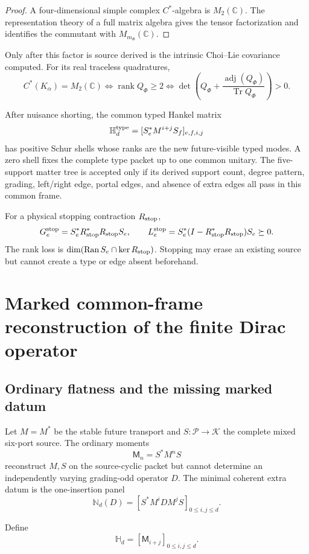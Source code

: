 \documentclass[11pt,oneside,openany]{book}
\numberwithin{equation}{chapter}
\theoremstyle{definition}
\theoremstyle{remark}
\newcommand{\C}{\mathbb C}
\newcommand{\Tr}{\operatorname{Tr}}
\newcommand{\rank}{\operatorname{rank}}
\newcommand{\Ran}{\operatorname{Ran}}
\newcommand{\adj}{\operatorname{adj}}
\begin{document}
\begin{proof}
A four-dimensional simple complex \(C^*\)-algebra is \(M_2(\C)\).  The
representation theory of a full matrix algebra gives the tensor factorization
and identifies the commutant with \(M_{m_\Phi}(\C)\).
\end{proof}

Only after this factor is source derived is the intrinsic Choi--Lie covariance
computed.  For its real traceless quadratures,
\[
 \boxed{C^*(K_\alpha)=M_2(\C)
 \iff \rank Q_\Phi\ge2
 \iff \det\left(Q_\Phi+\frac{\adj(Q_\Phi)}{\Tr Q_\Phi}\right)>0.}
\]

After nuisance shorting, the common typed Hankel matrix
\[
 \mathbb H_d^{\rm type}=[S_e^*M^{i+j}S_f]_{e,f,i,j}
\]
has positive Schur shells whose ranks are the new future-visible typed modes.
A zero shell fixes the complete type packet up to one common unitary.  The
five-support matter tree is accepted only if its derived support count, degree
pattern, grading, left/right edge, portal edges, and absence of extra edges all
pass in this common frame.

For a physical stopping contraction \(R_{\rm stop}\),
\[
 G_e^{\rm stop}=S_e^*R_{\rm stop}^*R_{\rm stop}S_e,
 \qquad
 L_e^{\rm stop}=S_e^*(I-R_{\rm stop}^*R_{\rm stop})S_e\succeq0.
\]
The rank loss is \(\dim(\Ran S_e\cap\ker R_{\rm stop})\).  Stopping may erase
an existing source but cannot create a type or edge absent beforehand.

\chapter{Marked common-frame reconstruction of the finite Dirac operator}
\label{ch:v6-marked-dirac}

\section{Ordinary flatness and the missing marked datum}
Let \(M=M^*\) be the stable future transport and
\(S:\mathcal P\to\mathcal K\) the complete mixed six-port source.  The ordinary
moments
\[
 \mathsf M_n=S^*M^nS
\]
reconstruct \(M,S\) on the source-cyclic packet but cannot determine an
independently varying grading-odd operator \(D\).  The minimal coherent extra
datum is the one-insertion panel
\[
 \boxed{\mathbb N_d(D)=[S^*M^iDM^jS]_{0\le i,j\le d}.}
\]

Define
\[
 \mathbb H_d=[\mathsf M_{i+j}]_{0\le i,j\le d}.
\]
\end{document}
